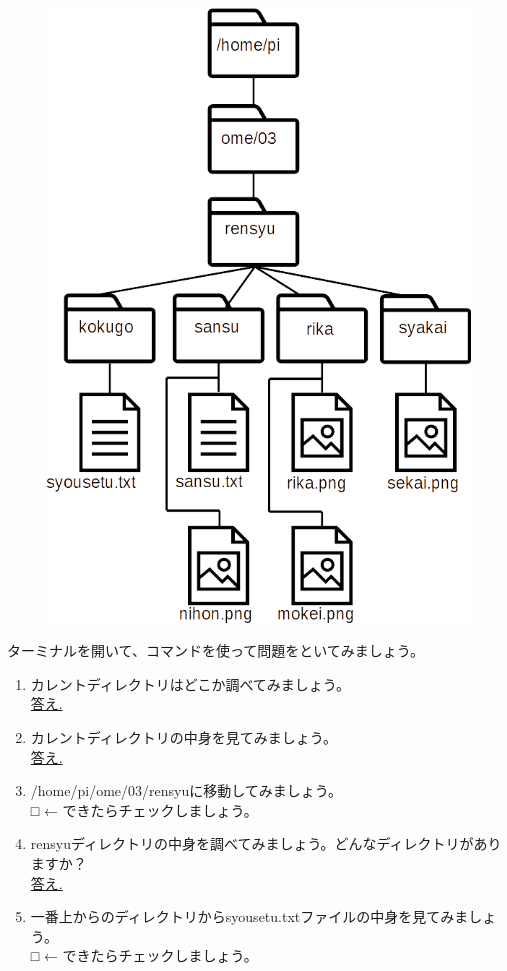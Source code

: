 
\begin{tcolorbox}[title=\useOmetoi,breakable]
\begin{figure}[H]
    \centering
    \includegraphics[width=0.6\linewidth]{images/chap03/text03-img029.png}
\end{figure}
ターミナルを開いて、コマンドを使って問題をといてみましょう。\\
\begin{enumerate}
\item カレントディレクトリはどこか調べてみましょう。\\
\underline{答え.\hspace{0.8\linewidth}}
\item カレントディレクトリの中身を見てみましょう。\\
\underline{答え.\hspace{0.8\linewidth}}
\item /home/pi/ome/03/rensyuに移動してみましょう。\\
□ ← できたらチェックしましょう。
\item rensyuディレクトリの中身を調べてみましょう。どんなディレクトリがありますか？\\
\underline{答え.\hspace{0.8\linewidth}}
\item 一番上からのディレクトリからsyousetu.txtファイルの中身を見てみましょう。\\
□ ← できたらチェックしましょう。

\end{enumerate}
\end{tcolorbox}
